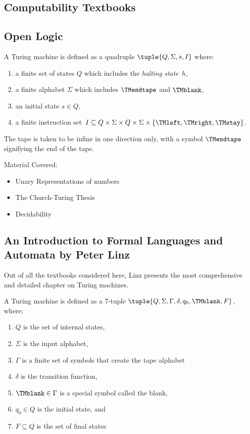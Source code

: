 \documentclass[../../include/open-logic-section]{subfiles}
\begin{document}

\subsection{Computability Textbooks}

\subsection{Open Logic}
A Turing machine is defined as a quadruple $\tuple{Q, \Sigma, s, I}$ where:
\begin{enumerate}
\item a finite set of states $Q$ which includes the \emph{halting
state}~$h$,
\item a finite alphabet $\Sigma$ which includes $\TMendtape$ and
  $\TMblank$,
\item an initial state $s \in Q$,
\item a finite instruction set~$I \subseteq Q \times \Sigma \times Q
  \times \Sigma \times \{\TMleft, \TMright, \TMstay\}$.
\end{enumerate}

The tape is taken to be infine in one direction only, with a symbol $\TMendtape$ signifying the end of the tape.

Material Covered:
\begin{itemize}
\item Unary Representations of numbers
\item The Church-Turing Thesis
\item Decidability
\end{itemize}

\subsection{An Introduction to Formal Languages and Automata by Peter Linz}

Out of all the textbooks considered here, Linz presents the most comprehensive and detailed chapter on Turing machines.

A Turing machine is defined as a 7-tuple $\tuple{Q, \Sigma, \Gamma, \delta, q_0, \TMblank, F}$, where:
\begin{enumerate}
\item $Q$ is the set of internal states,
\item $\Sigma$ is the input alphabet,
\item $\Gamma$ is a finite set of symbols that create the tape alphabet
\item $\delta$ is the transition function,
\item $\TMblank \in \Gamma$ is a special symbol called the blank,
\item $q_0 \in Q$ is the initial state, and
\item $F \subseteq Q$ is the set of final states
\end{enumerate}
\end{document}
